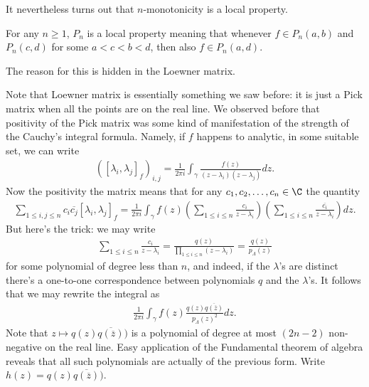 It nevertheless turns out that $n$-monotonicity is a local property.

\begin{prop}
	For any $n \geq 1$, $P_{n}$ is a local property meaning that whenever $f \in P_{n}(a, b)$ and $P_{n}(c, d)$ for some $a < c < b < d$, then also $f \in P_{n}(a, d)$.
\end{prop}

The reason for this is hidden in the Loewner matrix.

Note that Loewner matrix is essentially something we saw before: it is just a Pick matrix when all the points are on the real line. We observed before that positivity of the Pick matrix was some kind of manifestation of the strength of the Cauchy's integral formula. Namely, if $f$ happens to analytic, in some suitable set, we can write
\begin{align*}
	\left([\lambda_{i}, \lambda_{j}]_{f}\right)_{i, j} = \frac{1}{2 \pi i}\int_{\gamma} \frac{f(z)}{(z - \lambda_{i})(z - \lambda_{j})} dz.
\end{align*}
Now the positivity the matrix means that for any $c_{1}, c_{2}, \ldots, c_{n} \in \C$ the quantity
\begin{align*}
	\sum_{1 \leq i, j \leq n} c_{i} \overline{c_{j}} [\lambda_{i}, \lambda_{j}]_{f} = \frac{1}{2 \pi i}\int_{\gamma}f(z) \left(\sum_{1 \leq i \leq n} \frac{c_{i}}{z - \lambda_{i}}\right) \left( \sum_{1 \leq i \leq n} \frac{\overline{c_{i}}}{z - \lambda_{i}}\right)dz.
\end{align*}
But here's the trick: we may write
\begin{align*}
	\sum_{1 \leq i \leq n} \frac{c_{i}}{z - \lambda_{i}} = \frac{q(z)}{\prod_{1 \leq i \leq n} (z - \lambda_{i})} = \frac{q(z)}{p_{\Lambda}(z)}
\end{align*}
for some polynomial of degree less than $n$, and indeed, if the $\lambda$'s are distinct there's a one-to-one correspondence between polynomials $q$ and the $\lambda$'s. It follows that we may rewrite the integral as
\begin{align*}
\frac{1}{2 \pi i}\int_{\gamma}f(z) \frac{q(z) \overline{q(\overline{z})}}{p_{\Lambda}(z)^2}dz.
\end{align*}
Note that $z \mapsto q(z)\overline{q(\overline{z})})$ is a polynomial of degree at most $(2 n - 2)$ non-negative on the real line. Easy application of the Fundamental theorem of algebra reveals that all such polynomials are actually of the previous form. Write $h(z) = q(z)\overline{q(\overline{z})})$.

